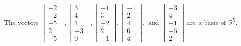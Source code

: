 \begin{exercise}
\begin{exerciseStatement}
  \end{exerciseStatement}
  \begin{exerciseAnswer}
   The vectors \(\left[\begin{array}{r}
-2 \\
-2 \\
-5 \\
2 \\
-5
\end{array}\right] , \left[\begin{array}{r}
3 \\
4 \\
1 \\
-3 \\
0
\end{array}\right] , \left[\begin{array}{r}
-1 \\
3 \\
-2 \\
2 \\
-1
\end{array}\right] , \left[\begin{array}{r}
-1 \\
2 \\
4 \\
0 \\
4
\end{array}\right] , \text{ and } \left[\begin{array}{r}
-3 \\
4 \\
-1 \\
-5 \\
2
\end{array}\right]\) 
  	 are  a basis of \(\mathbb{R}^5\).
  


  \end{exerciseAnswer}
\end{exercise}